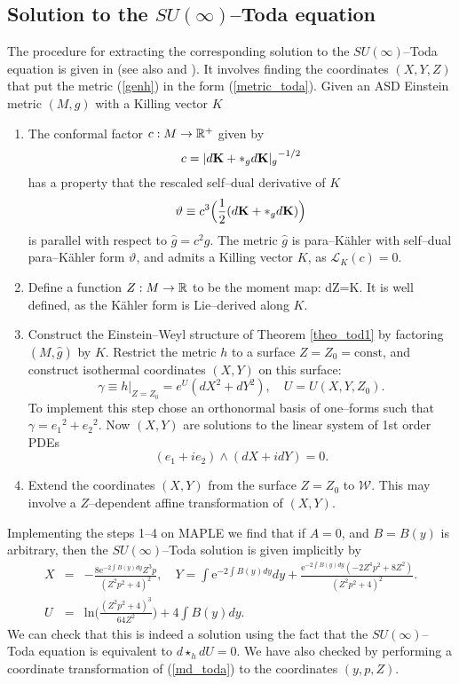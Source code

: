 \subsection{Solution to the $SU(\infty)$--Toda equation}
\label{steps_sec}
The procedure for extracting the corresponding solution to the $SU(\infty)$--Toda equation is given in \cite{Tod_note} 
(see also \cite{LeBrun} and \cite{DT}). It involves finding the coordinates $(X,Y,Z)$ that put the metric (\ref{genh}) in the 
form (\ref{metric_toda}). Given an ASD Einstein metric $(M, g)$ with a
Killing vector $K$
\begin{enumerate}
\item The conformal factor $c:M\rightarrow \mathbb{R}^+$  given by
\[
c={|d{\bf K}+*_g d{\bf K}|_{g}}^{-1/2}
\]
has a property that
the rescaled self--dual derivative of $K$
\[
\vartheta\equiv c^3\Big(\frac{1}{2}(d{\bf K}+*_g d{\bf K})\Big)
\]
is parallel with respect to $\hat{g}=c^2 g$.
The metric $\hat{g}$ is para--K\"ahler with  self--dual 
para--K\"ahler form $\vartheta$, and admits a Killing vector $K$, as
${\mathcal L}_K(c)=0$.
\item
Define a function $Z:M\rightarrow \mathbb{R}$ to be the moment map:
\be
\label{ztilde}
dZ=K\hook \vartheta.
\ee
It is well defined, as the K\"ahler form is Lie--derived along $K$.
\item
Construct the Einstein--Weyl structure of Theorem \ref{theo_tod1}
by factoring $(M, \hat{g})$ by $K$. Restrict the metric $h$
to a surface $Z=Z_0=\mbox{const}$, and construct isothermal coordinates 
$(X, Y)$ on this surface:
\[
\gamma\equiv h|_{Z=Z_0}=e^{U}(dX^2+dY^2), \quad U=U(X, Y, Z_0).
\]
To implement this step chose an orthonormal basis of one--forms
such that $\gamma= {e_1}^2+{e_2}^2$. Now $(X, Y)$ are solutions to the linear
system of 1st order PDEs
\[
(e_1+ie_2)\wedge (dX+idY)=0.
\]
\item Extend the coordinates $(X, Y)$ from the surface $Z=Z_0$ to $\mathcal{W}$. This may
involve a $Z$--dependent affine transformation of $(X, Y)$.
\end{enumerate}
Implementing the steps 1--4 on MAPLE we find that if $A=0$, and $B=B(y)$ 
is arbitrary, then the $SU(\infty)$--Toda solution is given implicitly by
\begin{eqnarray}
\label{toda_implicit1}
 X&=&-\frac{8\mathrm{e}^{-2\int{B(y)dy}}Z^3p}{(Z^2p^2+4)^2},\quad
Y=\int{\mathrm{e}^{-2\int{B(y)dy}}dy}+\frac{\mathrm{e}^{-2\int{B(y)dy}}(-2Z^4p^2+8Z^2)}{(Z^2p^2+4)^2}.\nonumber\\
U&=&\mathrm{ln}\bigg(\frac{(Z^2p^2+4)^3}{64Z^2}\bigg)+4\int{B(y)dy}.
\end{eqnarray}
We can check that this is indeed a solution using the fact that the $SU(\infty)$--Toda equation is equivalent to 
$d\star_h dU=0$. We have also checked by performing a coordinate transformation of (\ref{md_toda}) to the coordinates $(y,p,Z)$.

